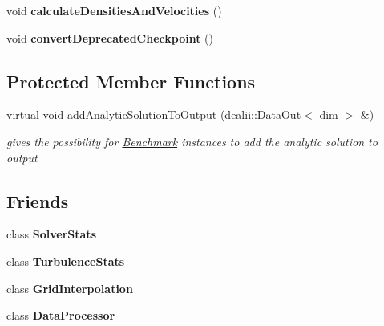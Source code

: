 \begin{DoxyCompactItemize}
\item 
\hypertarget{classnatrium_1_1CFDSolver_a3bad216de02aadc0892500a506278bea}{
void {\bfseries calculateDensitiesAndVelocities} ()}
\label{classnatrium_1_1CFDSolver_a3bad216de02aadc0892500a506278bea}

\item 
\hypertarget{classnatrium_1_1CFDSolver_a99345508302dadfe261795c05154dbcf}{
void {\bfseries convertDeprecatedCheckpoint} ()}
\label{classnatrium_1_1CFDSolver_a99345508302dadfe261795c05154dbcf}

\end{DoxyCompactItemize}
\subsection*{Protected Member Functions}
\begin{DoxyCompactItemize}
\item 
\hypertarget{classnatrium_1_1CFDSolver_a9107b3f462bddc5b7988ec93f78797c2}{
virtual void \hyperlink{classnatrium_1_1CFDSolver_a9107b3f462bddc5b7988ec93f78797c2}{addAnalyticSolutionToOutput} (dealii::DataOut$<$ dim $>$ \&)}
\label{classnatrium_1_1CFDSolver_a9107b3f462bddc5b7988ec93f78797c2}

\begin{DoxyCompactList}\small\item\em gives the possibility for \hyperlink{classnatrium_1_1Benchmark}{Benchmark} instances to add the analytic solution to output \item\end{DoxyCompactList}\end{DoxyCompactItemize}
\subsection*{Friends}
\begin{DoxyCompactItemize}
\item 
\hypertarget{classnatrium_1_1CFDSolver_a077a2603e5a09310a68f71b538415f46}{
class {\bfseries SolverStats}}
\label{classnatrium_1_1CFDSolver_a077a2603e5a09310a68f71b538415f46}

\item 
\hypertarget{classnatrium_1_1CFDSolver_a9e02a35cca963a424cefdfcb10da0ae2}{
class {\bfseries TurbulenceStats}}
\label{classnatrium_1_1CFDSolver_a9e02a35cca963a424cefdfcb10da0ae2}

\item 
\hypertarget{classnatrium_1_1CFDSolver_a1c3d409128c8407e63df35854c90c16a}{
class {\bfseries GridInterpolation}}
\label{classnatrium_1_1CFDSolver_a1c3d409128c8407e63df35854c90c16a}

\item 
\hypertarget{classnatrium_1_1CFDSolver_aa6f06b52d887407954e9683fba72badc}{
class {\bfseries DataProcessor}}
\label{classnatrium_1_1CFDSolver_aa6f06b52d887407954e9683fba72badc}

\end{DoxyCompactItemize}


